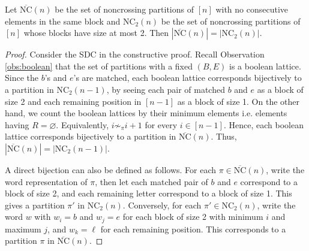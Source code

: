 

\begin{proposition}
  Let $\overline{\text{NC}}(n)$ be the set of noncrossing partitions of $[n]$ with no consecutive elements in the same block and $\text{NC}_2(n)$ be the set of noncrossing partitions of $[n]$ whose blocks have size at most 2. Then $|\overline{\text{NC}}(n)| = |\text{NC}_2(n)|$.
\end{proposition}

\begin{proof}
  Consider the SDC in the constructive proof. Recall Observation \ref{obs:boolean} that the set of partitions with a fixed $(B,E)$ is a boolean lattice. Since the $b$'s and $e$'s are matched, each boolean lattice corresponds bijectively to a partition in $\text{NC}_2(n-1)$, by seeing each pair of matched $b$ and $e$ as a block of size 2 and each remaining position in $[n-1]$ as a block of size 1. On the other hand, we count the boolean lattices by their minimum elements i.e. elements having $R=\varnothing$. Equivalently, $i\not\sim_\pi i+1$ for every $i\in[n-1]$. Hence, each boolean lattice corresponds bijectively to a partition in $\overline{\text{NC}}(n)$. Thus, $|\overline{\text{NC}}(n)| = |\text{NC}_2(n-1)|$.

  A direct bijection can also be defined as follows. For each $\pi\in \overline{\text{NC}}(n)$, write the word representation of $\pi$, then let each matched pair of $b$ and $e$ correspond to a block of size 2, and each remaining letter correspond to a block of size 1. This gives a partition $\pi'$ in $\text{NC}_2(n)$. Conversely, for each $\pi'\in \text{NC}_2(n)$, write the word $w$ with $w_i = b$ and $w_j = e$ for each block of size 2 with minimum $i$ and maximum $j$, and $w_k = \ell$ for each remaining position. This corresponds to a partition $\pi$ in $\overline{\text{NC}}(n)$.
\end{proof}

